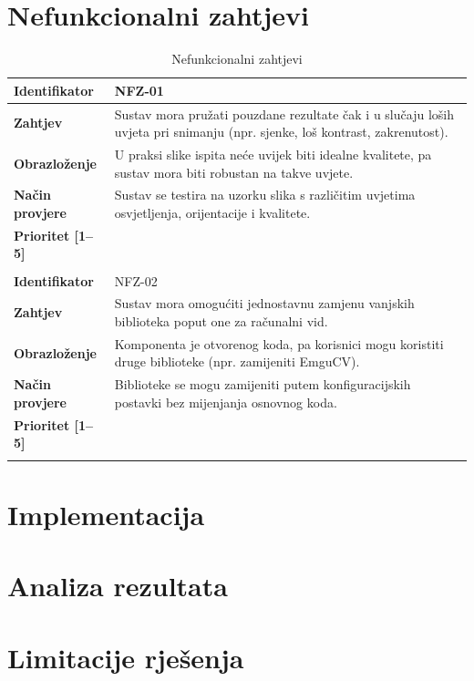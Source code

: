 \documentclass{foi}
\begin{document}
\section{Nefunkcionalni zahtjevi}

\begin{longtable}{|l|p{12cm}|}
    \hline
    \textbf{Identifikator} & NFZ-01 \\ \hline
    \textbf{Zahtjev} & Sustav mora pružati pouzdane rezultate čak i u slučaju loših uvjeta pri snimanju (npr. sjenke, loš kontrast, zakrenutost). \\ \hline
    \textbf{Obrazloženje} & U praksi slike ispita neće uvijek biti idealne kvalitete, pa sustav mora biti robustan na takve uvjete. \\ \hline
    \textbf{Način provjere} & Sustav se testira na uzorku slika s različitim uvjetima osvjetljenja, orijentacije i kvalitete. \\ \hline
    \textbf{Prioritet [1--5]} &  \\ \hline
    \multicolumn{2}{|c|}{} \\ \hline
    
    \textbf{Identifikator} & NFZ-02 \\ \hline
    \textbf{Zahtjev} & Sustav mora omogućiti jednostavnu zamjenu vanjskih biblioteka poput one za računalni vid. \\ \hline
    \textbf{Obrazloženje} & Komponenta je otvorenog koda, pa korisnici mogu koristiti druge biblioteke (npr. zamijeniti EmguCV). \\ \hline
    \textbf{Način provjere} & Biblioteke se mogu zamijeniti putem konfiguracijskih postavki bez mijenjanja osnovnog koda. \\ \hline
    \textbf{Prioritet [1--5]} &  \\ \hline
    
    \caption{Nefunkcionalni zahtjevi}
\end{longtable}
    


\section{Implementacija}
\section{Analiza rezultata}
\section{Limitacije rješenja}
\end{document}
